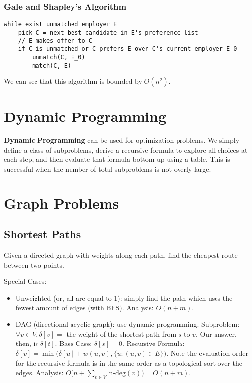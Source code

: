 \documentclass[12pt]{article}
\begin{document}
\subsubsection{Gale and Shapley's Algorithm}
\begin{verbatim}
while exist unmatched employer E
    pick C = next best candidate in E's preference list
    // E makes offer to C
    if C is unmatched or C prefers E over C's current employer E_0
        unmatch(C, E_0)
        match(C, E)
\end{verbatim}
We can see that this algorithm is bounded by $O(n^2)$.

\section{Dynamic Programming}
{\bf Dynamic Programming} can be used for optimization problems. We simply define a class of subproblems, derive a recursive formula to explore all choices at each step, and then evaluate that formula bottom-up using a table. This is successful when the number of total subproblems is not overly large.



\section{Graph Problems}

\subsection{Shortest Paths}
Given a directed graph with weights along each path, find the cheapest route between two points.

Special Cases:
\begin{itemize}
\item Unweighted (or, all are equal to 1): simply find the path which uses the fewest amount of edges (with BFS). Analysis: $O(n + m)$.
\item DAG (directional acyclic graph): use dynamic programming. Subproblem: $\forall v \in V, \delta[v] =$ the weight of the shortest path from $s$ to $v$. Our answer, then, is $\delta[t]$. Base Case: $\delta[s] = 0$. Recursive Formula: $\delta[v] = \min\bigl(\delta[u] + w(u, v), \{u : (u,v) \in E\}\bigl)$. Note the evaluation order for the recursive formula is in the same order as a topological sort over the edges. Analysis: $O\bigl(n + \displaystyle\sum_{v\in V} \text{in-deg}(v)\bigl) = O(n + m)$.
\end{itemize}
\end{document}
